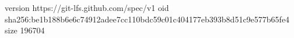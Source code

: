 version https://git-lfs.github.com/spec/v1
oid sha256:be1b188b6e6c74912adee7cc110bdc59c01c404177eb393b8d51c9e577b65fe4
size 196704
